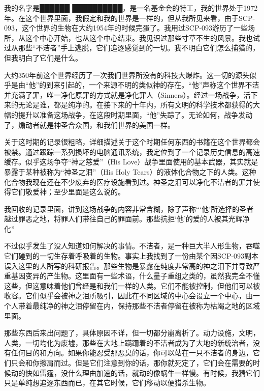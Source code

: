 
\begin{scpbox}

我的名字是██████ ██████████，是一名基金会的特工，我的世界处于1972年。在这个世界里面，我假定和我的世界是一样的，但从我所见来看，由于SCP-093，这个世界的生物在大约1954年的时候完蛋了。我用过SCP-093游历了一些场所，从这个中心开始，也从这个中心结束。我见识过那些寸草不生的风景。我也试过从那些“不洁者”手上逃脱，它们追逐感觉到的一切。我不明白它们怎么捕猎的，但我明白了它们是什么。

大约350年前这个世界经历了一次我们世界所没有的科技大爆炸。这一切的源头似乎是由“他”的到来引起的，一个来源不明的类似神的存在。“他”声称这个世界不洁并充满了罪，唯一净化原罪的方式就是净化罪人（Sinners）。经过一场战争，活下来的无论是谁，都是纯净的。在接下来的十年内，所有文明的科学技术都获得的大幅的提升以准备这场战争，在这段时期里面，“他”失踪了。无论如何，战争发动了，煽动者就是神圣合众国，和我们世界的美国一样。

关于这时期的记录很粗略，详细描述关于这个时期任何东西的书籍在这个世界都会被禁。通过跟踪一系列损坏的电脑通讯系统，我定位到了一个记录历史信息的高速缓存。似乎这场争夺“神之慈爱”（His Love）战争里面使用的基本武器，其实就是暴露于某种被称为“神圣之泪”（His Holy Tears）的液体化合物之下的人类。这种化合物我现在还在不少废弃的医疗设施看到过。神圣之泪可以净化不洁者的罪并使得它们敬爱神；至少里面是这么说的。

我回收的记录里面，讲到这场战争的内容非常含糊，除了声称“‘他’所选择的圣者越过罪恶之地，将罪人们带往自己的罪面前。那些抗拒‘他’的爱的人被其光辉净化”

不过似乎发生了没人知道如何解决的事情。不洁者，是一种巨大半人形生物，吞噬它们碰到的一切生存着呼吸着的生物。事实上我找到了一份由某个因SCP-093副本误入这里的人所写的科研报告。那些生物是暴露在纯度非常高的神之泪下并导致严重基因变异的产生物。这里面有一些术语，什么量子重组之类的，虽然我完全不懂这些，但这意味着他们曾经是和我们一样的人类。它们不能被控制，但他们可以被收容。它们似乎会被神之泪所吸引，因此在不同区域的中心会设立一个中心，由一个人带着最纯净的神之泪停留在内，保持那些不洁者停留在被称为枯竭之地的区域里面。

那些东西后来出问题了，具体原因不详，但一切都分崩离析了。动力设施，文明，人类，一切均化为废墟，那些在大地上蹒跚着的不洁者成为了大地的新统治者，没有任何目的和方向。如果你能忍受那恶臭的话，你可以站在一只不洁者的身边，它们只会和你擦肩而过。但是它们注意到你的话，那你就死定了，它们会在需要的时候动的快如雷霆，没什么理由加速的话，就动的像蜗牛一样慢。有时候，我猜它们只是单纯想追逐东西而已，在其它时候，它们移动以便猎杀生物。


\end{scpbox}
